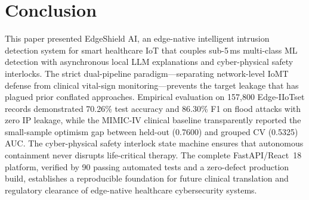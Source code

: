 \documentclass[conference]{IEEEtran}
\begin{document}
\section{Conclusion}
This paper presented EdgeShield AI, an edge-native intelligent intrusion detection system for smart healthcare IoT that couples sub-5\,ms multi-class ML detection with asynchronous local LLM explanations and cyber-physical safety interlocks. The strict dual-pipeline paradigm---separating network-level IoMT defense from clinical vital-sign monitoring---prevents the target leakage that has plagued prior conflated approaches. Empirical evaluation on 157{,}800 Edge-IIoTset records demonstrated 70.26\% test accuracy and 86.30\% F1 on flood attacks with zero IP leakage, while the MIMIC-IV clinical baseline transparently reported the small-sample optimism gap between held-out (0.7600) and grouped CV (0.5325) AUC. The cyber-physical safety interlock state machine ensures that autonomous containment never disrupts life-critical therapy. The complete FastAPI/React~18 platform, verified by 90 passing automated tests and a zero-defect production build, establishes a reproducible foundation for future clinical translation and regulatory clearance of edge-native healthcare cybersecurity systems.
\end{document}
